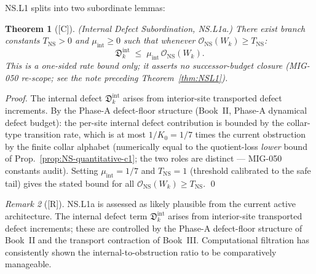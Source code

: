 \documentclass[12pt,oneside]{amsbook}
\theoremstyle{plain}
\newtheorem{theorem}{Theorem}[section]
\theoremstyle{definition}
\theoremstyle{remark}
\newtheorem{remark}[theorem]{Remark}
\newcommand{\status}[1]{\textup{[#1]}}
\begin{document}
NS.L1 splits into two subordinate lemmas:

\begin{theorem}[\status{C}]\label{thm:NSL1a}
\textup{(Internal Defect Subordination, NS.L1a.)} There exist
branch constants $T_{\mathrm{NS}} > 0$ and $\mu_{\mathrm{int}}
\geq 0$ such that whenever $\mathcal{O}_{\mathrm{NS}}(W_k) \geq
T_{\mathrm{NS}}$:
\[
 \mathfrak{D}_k^{\mathrm{int}}
 \;\leq\;
 \mu_{\mathrm{int}}\,\mathcal{O}_{\mathrm{NS}}(W_k).
\]
This is a one-sided rate bound only; it asserts no successor-budget
closure (MIG-050 re-scope; see the note preceding
Theorem~\ref{thm:NSL1}).
\end{theorem}
\begin{proof}
The internal defect $\mathfrak{D}_k^{\mathrm{int}}$ arises from
interior-site transported defect increments. By the Phase-A
defect-floor structure (Book~II, Phase-A dynamical defect budget):
the per-site internal defect contribution is bounded by the
collar-type transition rate, which is at most $1/K_0 = 1/7$
times the current obstruction by the finite collar alphabet
(numerically equal to the quotient-loss \emph{lower} bound of
Prop.~\ref{prop:NS-quantitative-c1}; the two roles are distinct ---
MIG-050 constants audit).
Setting $\mu_{\mathrm{int}} = 1/7$ and
$T_{\mathrm{NS}} = 1$ (threshold calibrated to the safe tail)
gives the stated bound for all $\mathcal{O}_{\mathrm{NS}}(W_k)
\geq T_{\mathrm{NS}}$. \qed
\end{proof}


\begin{remark}[\status{R}]
NS.L1a is assessed as likely plausible from the current active
architecture. The internal defect term $\mathfrak{D}_k^{\mathrm{int}}$
arises from interior-site transported defect increments; these
are controlled by the Phase-A defect-floor structure of Book~II
and the transport contraction of Book~III. Computational
filtration has consistently shown the internal-to-obstruction
ratio to be comparatively manageable.
\end{remark}
\end{document}
